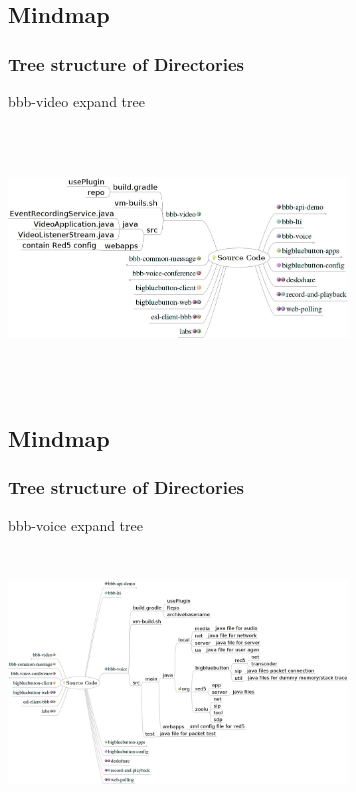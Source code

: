 \documentclass{beamer}
\begin{document}
\subsection*{Mindmap}
\begin{frame}
\frametitle{Tree structure of Directories}
{bbb-video expand tree}

\includegraphics[height=70mm,width=90mm]{./images/SourceCode4.jpeg}
\end{frame}



\subsection*{Mindmap}
\begin{frame}
\frametitle{Tree structure of Directories}
{bbb-voice expand tree}

\includegraphics[height=70mm,width=90mm]{./images/SourceCode5.jpeg}
\end{frame}
\end{document}
